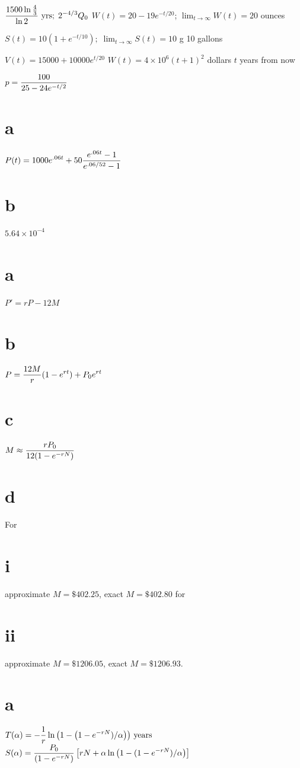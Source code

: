  $\displaystyle{\frac{1500\ln\frac{4}{3}}{\ln2}} \text{ yrs}; \;    2^{-4/3}Q_0$
 $W(t)=20-19e^{-t/20}$; $\lim_{t\to\infty}W(t)=20$  ounces

 $S(t)=10(1+e^{-t/10}); \;  \lim_{t\to\infty}S(t)=10$ g
 10 gallons

 $V(t)=15000+10000e^{t/20}$
$W(t)=4\times 10^6(t+1)^2$ dollars $t$  years from now

 $\displaystyle{p=\frac{100}{25-24e^{-t/2}}}$
\part{a} $\displaystyle{P(t)=1000e^{.06t}+50\frac{e^{.06t}-1}{e^{.06/52}-1}}$
\part{b} $5.64 \times 10^{-4}$

\part{a} $P'=rP-12M$
\part{b} $\displaystyle{P=\frac{12M}{r}(1-e^{rt})+P_0e^{rt}}$
\part{c}  $\displaystyle{M\approx\frac{rP_0}{12(1-e^{-rN})}}$
\part{d}  For \part{i} approximate $M=\$402.25$, exact
$M=\$402.80$
 for \part{ii} approximate $M=\$1206.05$, exact $M=\$1206.93$.

\part{a} $T(\alpha)=\displaystyle{-\frac{1}{r}\ln\left(1-\left(1-e^{-rN})/\alpha\right)\right)}\text{ years}$
 $S(\alpha)=\displaystyle{\frac{P_0}{(1-e^{-rN})}\left[rN+\alpha\ln
\left(1-(1-e^{-rN})/\alpha\right)\right]}$
